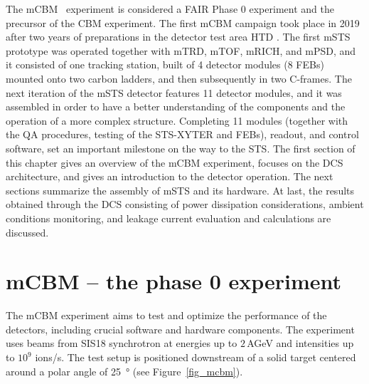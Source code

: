 The mCBM~\cite{mCBM} experiment is considered a \gls{FAIR} Phase \num{0} experiment and the precursor of the \gls{CBM} experiment. The first \gls{mCBM} campaign took place in \num{2019} after two years of preparations in the detector test area HTD \cite{progress_report_2017_sturm}. The first \gls{mSTS} prototype was operated together with mTRD, mTOF, mRICH, and mPSD, and it consisted of one tracking station, built of \num{4} detector modules (\num{8} \glspl{FEB}) mounted onto two carbon ladders, and then subsequently in two C-frames. The next iteration of the \gls{mSTS} detector features \num{11} detector modules, and it was assembled in order to have a better understanding of the components and the operation of a more complex structure. Completing \num{11} modules (together with the QA procedures, testing of the STS-XYTER and \glspl{FEB}), readout, and control software, set an important milestone on the way to the \gls{STS}. The first section of this chapter gives an overview of the \gls{mCBM} experiment, focuses on the \gls{DCS} architecture, and gives an introduction to the detector operation. The next sections summarize the assembly of \gls{mSTS} and its hardware. At last, the results obtained through the \gls{DCS} consisting of power dissipation considerations, ambient conditions monitoring, and leakage current evaluation and calculations are discussed.

\section{mCBM -- the phase 0 experiment}
The \gls{mCBM} experiment aims to test and optimize the performance of the detectors, including crucial software and hardware components. The experiment uses beams from SIS18 synchrotron at energies up to $2$\,AGeV and intensities up to $10^{9}$ ions/s. The test setup is positioned downstream of a solid target centered around a polar angle of \SI{25}{\degree} (see Figure~\ref{fig_mcbm}).

